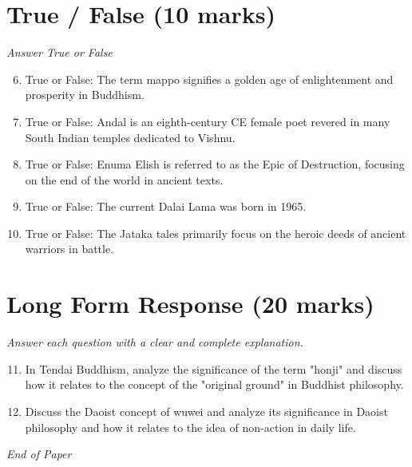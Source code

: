 \documentclass[12pt]{article}
\begin{document}
\section*{True / False (10 marks)}
\textit{Answer True or False}
\begin{enumerate}[label=\arabic*.]
\setcounter{enumi}{5}
\item True or False: The term mappo signifies a golden age of enlightenment and prosperity in Buddhism.
\item True or False: Andal is an eighth-century CE female poet revered in many South Indian temples dedicated to Vishnu.
\item True or False: Enuma Elish is referred to as the Epic of Destruction, focusing on the end of the world in ancient texts.
\item True or False: The current Dalai Lama was born in 1965.
\item True or False: The Jataka tales primarily focus on the heroic deeds of ancient warriors in battle.
\end{enumerate}

\section*{Long Form Response (20 marks)}
\textit{Answer each question with a clear and complete explanation.}
\begin{enumerate}[label=\arabic*.]
\setcounter{enumi}{10}
\item In Tendai Buddhism, analyze the significance of the term "honji" and discuss how it
relates to the concept of the "original ground" in Buddhist philosophy.
\item Discuss the Daoist concept of wuwei and analyze its significance in Daoist philosophy and
how it relates to the idea of non-action in daily life.
\end{enumerate}

\vfill
\noindent\textit{End of Paper}
\end{document}
